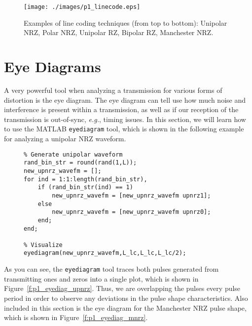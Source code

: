 \documentclass[letterpaper,12pt]{article}
\begin{document}


 
\begin{figure}[h]
 \centering
 \texttt{[image: ./images/p1\_linecode.eps]}
 \caption{Examples of line coding techniques (from top to bottom): Unipolar NRZ, Polar NRZ, Unipolar RZ, Bipolar RZ, Manchester NRZ.}\label{f:p1_linecode}
\end{figure}

\section{Eye Diagrams}

A very powerful tool when analyzing a transmission for various forms of distortion is the eye diagram.  The eye diagram can tell use how much noise and interference is present within a transmission, as well as if our reception of 
the transmission is out-of-sync, \textit{e.g.}, timing issues.  In this section, we will learn how to use the MATLAB \texttt{eyediagram} tool, which is shown in the following example for analyzing a unipolar NRZ waveform.
\begin{figure}[h]
\centering
\begin{minipage}[framed]{0.9\textwidth}
\begin{lstlisting}
% Generate unipolar waveform
rand_bin_str = round(rand(1,L));
new_upnrz_wavefm = [];
for ind = 1:1:length(rand_bin_str),
    if (rand_bin_str(ind) == 1)
        new_upnrz_wavefm = [new_upnrz_wavefm upnrz1];
    else
        new_upnrz_wavefm = [new_upnrz_wavefm upnrz0];
    end;
end;

% Visualize
eyediagram(new_upnrz_wavefm,L_lc,L_lc,L_lc/2);
\end{lstlisting}
\end{minipage}
\captionsetup{labelformat=empty}
\end{figure}

As you can see, the \texttt{eyediagram} tool traces both pulses generated from transmitting ones and zeros into a single plot, which is shown in Figure~\ref{f:p1_eyediag_upnrz}.  Thus, we are overlapping the pulses 
every pulse period in order to observe any deviations in the pulse shape characteristics.  Also included in this section is the eye diagram for the Manchester NRZ pulse shape, which is shown in Figure~\ref{f:p1_eyediag_mnrz}.
\end{document}
